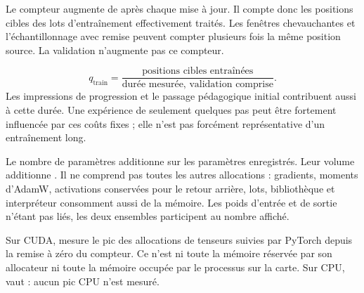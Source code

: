 

Le compteur  augmente de  après chaque
mise à jour. Il compte donc les positions cibles des lots d'entraînement
effectivement traités. Les fenêtres chevauchantes et l'échantillonnage avec
remise peuvent compter plusieurs fois la même position source.
La validation n'augmente pas ce compteur.

\[
 q_{\mathrm{train}}=\frac{\text{positions cibles entraînées}}
 {\text{durée mesurée, validation comprise}}.
\]
Les impressions de progression et le passage pédagogique initial contribuent
aussi à cette durée. Une expérience de seulement quelques pas peut être
fortement influencée par ces coûts fixes ; elle n'est pas forcément
représentative d'un entraînement long.

Le nombre de paramètres additionne  sur les paramètres
enregistrés. Leur volume additionne
. Il ne comprend pas toutes les autres
allocations : gradients, moments d'AdamW, activations conservées pour le
retour arrière, lots, bibliothèque et interpréteur consomment aussi de la
mémoire. Les poids d'entrée et de sortie n'étant pas liés, les deux ensembles
participent au nombre affiché.

Sur CUDA,  mesure le pic des allocations de
tenseurs suivies par PyTorch depuis la remise à zéro du compteur.
Ce n'est ni toute la mémoire réservée par son allocateur ni toute la
mémoire occupée par le processus sur la carte. Sur CPU,
 vaut  : aucun pic CPU n'est mesuré.

